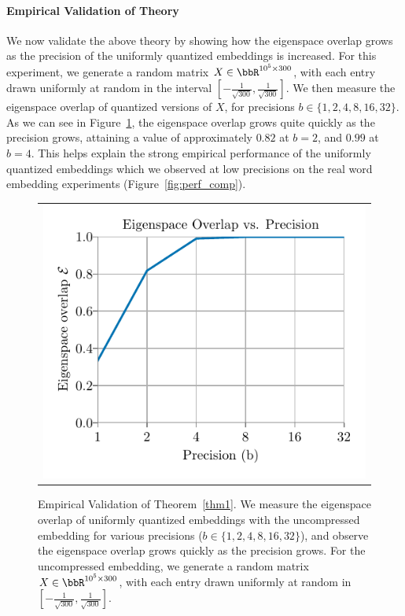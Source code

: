 \paragraph{Empirical Validation of Theory}
We now validate the above theory by showing how the eigenspace overlap grows as the precision of the uniformly quantized embeddings is increased.
For this experiment, we generate a random matrix $X \in \RR^{10^5 \times 300}$, with each entry drawn uniformly at random in the interval $[-\frac{1}{\sqrt{300}}, \frac{1}{\sqrt{300}}]$.
We then measure the eigenspace overlap of quantized versions of $X$, for precisions $b \in \{1,2,4,8,16,32\}$.
As we can see in Figure~\ref{fig:micro_eigoverlap_vs_prec}, the eigenspace overlap grows quite quickly as the precision grows, attaining a value of approximately $0.82$ at $b=2$, and $0.99$ at $b=4$.
This helps explain the strong empirical performance of the uniformly quantized embeddings which we observed at low precisions on the real word embedding experiments (Figure~\ref{fig:perf_comp}).


\begin{figure}
	\begin{tabular}{c}
		\includegraphics[width=\linewidth]{figures/micro_eig_overlap_vs_precision.pdf} 
\end{tabular}
\caption{Empirical Validation of Theorem~\ref{thm1}. We measure the eigenspace overlap of uniformly quantized embeddings with the uncompressed embedding for various precisions ($b\in\{1,2,4,8,16,32\}$), and observe the eigenspace overlap grows quickly as the precision grows.  For the uncompressed embedding, we generate a random matrix $X \in \RR^{10^5 \times 300}$, with each entry drawn uniformly at random in $[-\frac{1}{\sqrt{300}}, \frac{1}{\sqrt{300}}]$.}
\label{fig:micro_eigoverlap_vs_prec}
\end{figure}

